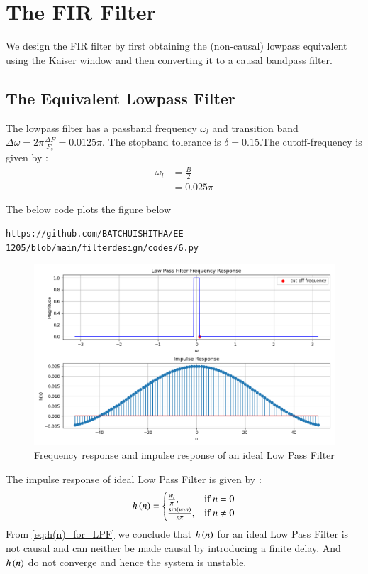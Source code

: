 \documentclass{article}
\begin{document}
\section{The FIR Filter}
We design the FIR filter by first obtaining the (non-causal) lowpass equivalent using the Kaiser window
and then
converting it to a causal bandpass filter.
\subsection{The Equivalent Lowpass Filter}
The lowpass filter has a passband frequency $\omega_l$ and transition band $\Delta \omega = 2\pi \frac{\Delta F}{F_s} = 0.0125\pi$.
The stopband tolerance is $\delta=0.15$.The cutoff-frequency is given by :
\begin{align}
    \omega_{l} &= \frac{B}{2}\\
                &= 0.025\pi
\end{align}

The below code plots the figure below
\begin{lstlisting}
https://github.com/BATCHUISHITHA/EE-1205/blob/main/filterdesign/codes/6.py
\end{lstlisting} 
\begin{figure}[H]
\centering
\includegraphics[width=1\columnwidth]{figs/6.png}
\caption{Frequency response and impulse response of an ideal Low Pass Filter}
\label{fig:LPF_FIR_1}
\end{figure}

The impulse response of ideal Low Pass Filter is given by :
\begin{align}
    h\left(n\right) = 
\begin{cases} 
    \frac{w_l}{\pi}, & \text{if } n = 0 \\
    \frac{\sin(w_l n)}{n\pi}, & \text{if } n \neq 0
\end{cases} \label{eq:h(n)_for_LPF}
\end{align}
From \eqref{eq:h(n)_for_LPF} we conclude that $h\left(n\right)$ for an ideal Low Pass Filter is not causal and can neither be made causal by introducing a finite delay. And $h\left(n\right)$ do not converge and hence the system is unstable.
\end{document}
